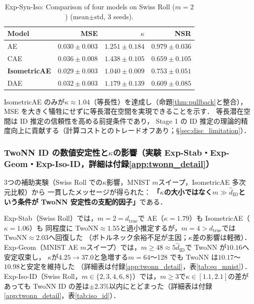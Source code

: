 \documentclass[11pt,a4paper]{jsarticle}
\newcommand{\kap}{\kappa}
\begin{document}
\begin{table}[H]
\centering
\caption{Exp-Syn-Iso: Comparison of four models on Swiss Roll ($m=2$) (mean$\pm$std, 3 seeds).}
\label{tab:ec}
\small
\begin{tabular}{lrrr}
\toprule
Model & MSE & $\kap$ & NSR \\
\midrule
AE & $0.030\pm0.003$ & $1.251\pm0.184$ & $0.979\pm0.036$ \\
CAE & $0.036\pm0.008$ & $1.438\pm0.105$ & $0.659\pm0.105$ \\
\textbf{IsometricAE} & $\boldsymbol{0.029\pm0.003}$ & $\boldsymbol{1.040\pm0.009}$ & $0.753\pm0.051$ \\
DAE & $0.032\pm0.003$ & $1.179\pm0.139$ & $0.609\pm0.085$ \\
\bottomrule
\end{tabular}
\end{table}

IsometricAE のみが$\kap \approx 1.04$（等長性）を達成し（命題\ref{thm:pullback}と整合），
MSE を大きく犠牲にせずに等長潜在空間を実現できることを示す．
等長潜在空間は ID 推定の信頼性を高める前提条件であり，
Stage 1 の ID 推定の理論的精度向上に貢献する（計算コストとのトレードオフあり；§\ref{sec:disc_limitation}）．

\subsubsection{TwoNN ID の数値安定性と$\kap$の影響（実験 Exp-Stab・Exp-Geom・Exp-Iso-ID，詳細は付録\ref{app:twonn_detail}）}\label{sec:exp_ep}

3つの補助実験（Swiss Roll での$\kap$影響，MNIST $m$スイープ，IsometricAE 多次元比較）から
一貫したメッセージが得られた：
\textbf{「$\kap$の大小ではなく$m \gg \hat{d}_\mathrm{ID}$という条件が TwoNN 安定性の支配的因子」}である．

Exp-Stab（Swiss Roll）では，$m=2=d_\mathrm{true}$で AE（$\kap=1.79$）も IsometricAE（$\kap=1.06$）も
同程度に TwoNN$\approx1.55$と過小推定するが，$m=4>d_\mathrm{true}$では TwoNN$\approx2.03$へ回復した
（ボトルネック余裕不足が主因；$\kap$差の影響は軽微）．
Exp-Geom（MNIST AE $m$スイープ）では，$m \geq 48 \approx 5\hat{d}_\mathrm{ID}$で TwoNN が$10.16$へ安定収束し，
$\kap$が$4.25 \to 37.0$と急増する$m=64$〜128 でも TwoNN は$10.17$〜$10.98$と安定を維持した
（詳細表は付録\ref{app:twonn_detail}，表\ref{tab:eq_mnist}）．
Exp-Iso-ID（Swiss Roll，$m \in \{2,3,4,6,8\}$）では，$m \geq 3$で$\kap \in [1.1, 2.1]$の差があっても
TwoNN ID の差は$\pm2.3\%$以内にとどまった（詳細表は付録\ref{app:twonn_detail}，表\ref{tab:iso_id}）．
\end{document}

